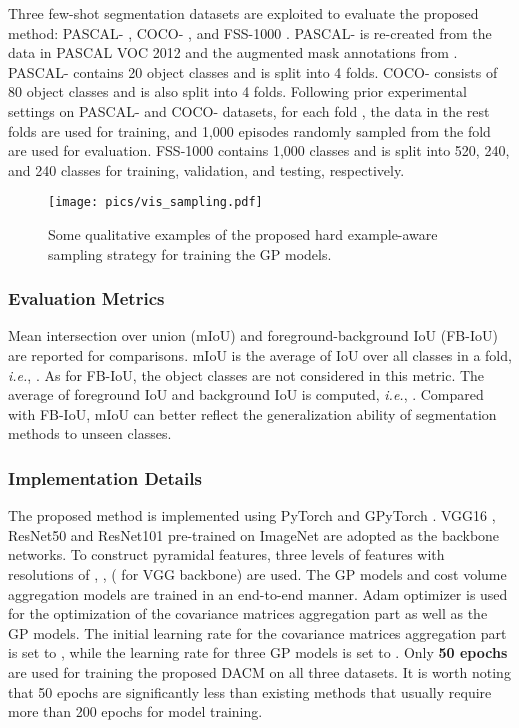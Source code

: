 \documentclass[runningheads]{llncs}
\begin{document}
Three few-shot segmentation datasets are exploited to evaluate the proposed method: PASCAL- \cite{shaban2017one}, COCO- \cite{lin2014microsoft}, and FSS-1000 \cite{li2020fss}. PASCAL- is re-created from the data in PASCAL VOC 2012 \cite{everingham2015pascal} and the augmented mask annotations from \cite{hariharan2014simultaneous}. PASCAL- contains 20 object classes and is split into 4 folds. COCO- consists of 80 object classes and is also split into 4 folds. Following prior experimental settings \cite{liu2020part,wang2020few,nguyen2019feature,tian2020prior} on PASCAL- and COCO- datasets, for each fold , the data in the rest folds are used for training, and 1,000 episodes randomly sampled from the fold  are used for evaluation. FSS-1000 contains 1,000 classes and is split into 520, 240, and 240 classes for training, validation, and testing, respectively.
\begin{figure}[tbb]
	\centering
	\texttt{[image: pics/vis\_sampling.pdf]}
	\caption{Some qualitative examples of the proposed hard example-aware sampling strategy for training the GP models.}
	\label{sampling_vis}
\end{figure} 
\subsubsection{Evaluation Metrics}
Mean intersection over union (mIoU) and foreground-background IoU (FB-IoU) are reported for comparisons. mIoU is the average of IoU over all classes in a fold, \textit{i.e.}, . As for FB-IoU, the object classes are not considered in this metric. The average of foreground IoU and background IoU is computed, \textit{i.e.}, . Compared with FB-IoU, mIoU can better reflect the generalization ability of segmentation methods to unseen classes.

\subsubsection{Implementation Details}
The proposed method is implemented using PyTorch \cite{paszke2019pytorch} and GPyTorch \cite{gardner2018gpytorch}. VGG16 \cite{simonyan2014very}, ResNet50 and ResNet101 \cite{he2016deep} pre-trained on ImageNet are adopted as the backbone networks. To construct pyramidal features, three levels of features with resolutions of , ,  ( for VGG backbone) are used. The GP models and cost volume aggregation models are trained in an end-to-end manner. Adam optimizer \cite{kingma2014adam} is used for the optimization of the covariance matrices aggregation part as well as the GP models. The initial learning rate for the covariance matrices aggregation part is set to , while the learning rate for three GP models is set to . Only \textbf{50 epochs} are used for training the proposed DACM on all three datasets. It is worth noting that 50 epochs are significantly less than existing methods that usually require more than 200 epochs for model training.
\end{document}
